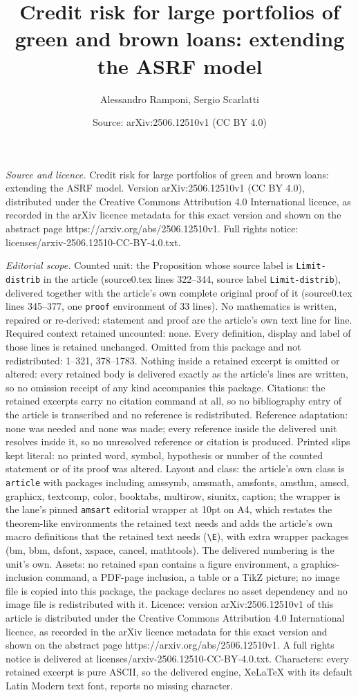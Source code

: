 \documentclass[10pt,a4paper]{amsart}
\title[Credit risk for large portfolios of green and brown loans: e]{Credit risk for large portfolios of green and brown loans: extending the ASRF model}
\author{Alessandro Ramponi, Sergio Scarlatti}
\date{Source: arXiv:2506.12510v1 (CC BY 4.0)}
\begin{document}
\maketitle

\noindent\emph{Source and licence.} Credit risk for large portfolios of green and brown loans: extending the ASRF model. Version arXiv:2506.12510v1 (CC BY 4.0), distributed under the Creative Commons Attribution 4.0 International licence, as recorded in the arXiv licence metadata for this exact version and shown on the abstract page https://arxiv.org/abs/2506.12510v1. Full rights notice: licenses/arxiv-2506.12510-CC-BY-4.0.txt.\par\smallskip

\noindent\textit{Editorial scope.} Counted unit: the Proposition whose source label is \texttt{Limit-distrib} in the article (source0.tex lines 322--344, source label \texttt{Limit-distrib}), delivered together with the article's own complete original proof of it (source0.tex lines 345--377, one \texttt{proof} environment of 33 lines). No mathematics is written, repaired or re-derived: statement and proof are the article's own text line for line. Required context retained uncounted: none. Every definition, display and label of those lines is retained unchanged. Omitted from this package and not redistributed: 1--321, 378--1783. Nothing inside a retained excerpt is omitted or altered: every retained body is delivered exactly as the article's lines are written, so no omission receipt of any kind accompanies this package. Citations: the retained excerpts carry no citation command at all, so no bibliography entry of the article is transcribed and no reference is redistributed. Reference adaptation: none was needed and none was made; every reference inside the delivered unit resolves inside it, so no unresolved reference or citation is produced. Printed slips kept literal: no printed word, symbol, hypothesis or number of the counted statement or of its proof was altered. Layout and class: the article's own class is \texttt{article} with packages including amssymb, amsmath, amsfonts, amsthm, amscd, graphicx, textcomp, color, booktabs, multirow, siunitx, caption; the wrapper is the lane's pinned \texttt{amsart} editorial wrapper at 10pt on A4, which restates the theorem-like environments the retained text needs and adds the article's own macro definitions that the retained text needs (\texttt{\textbackslash E}), with extra wrapper packages (bm, bbm, dsfont, xspace, cancel, mathtools). The delivered numbering is the unit's own. Assets: no retained span contains a figure environment, a graphics-inclusion command, a PDF-page inclusion, a table or a TikZ picture; no image file is copied into this package, the package declares no asset dependency and no image file is redistributed with it. Licence: version arXiv:2506.12510v1 of this article is distributed under the Creative Commons Attribution 4.0 International licence, as recorded in the arXiv licence metadata for this exact version and shown on the abstract page https://arxiv.org/abs/2506.12510v1. A full rights notice is delivered at licenses/arxiv-2506.12510-CC-BY-4.0.txt. Characters: every retained excerpt is pure ASCII, so the delivered engine, XeLaTeX with its default Latin Modern text font, reports no missing character.
\end{document}
